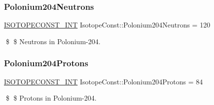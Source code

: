 \subsubsection{\texorpdfstring{Polonium204\+Neutrons}{Polonium204Neutrons}}
{\footnotesize\ttfamily \mbox{\hyperlink{group___isotope_const-_macros_ga5f18360b3e99483a35c32d789e62621c}{I\+S\+O\+T\+O\+P\+E\+C\+O\+N\+S\+T\+\_\+\+I\+NT}} Isotope\+Const\+::\+Polonium204\+Neutrons = 120}

\$ \$ Neutrons in Polonium-\/204. \mbox{\label{group___isotope_const-_polonium-_po204_ga4f330a2e2a2244c34d87a947978771e5}} 
\subsubsection{\texorpdfstring{Polonium204\+Protons}{Polonium204Protons}}
{\footnotesize\ttfamily \mbox{\hyperlink{group___isotope_const-_macros_ga5f18360b3e99483a35c32d789e62621c}{I\+S\+O\+T\+O\+P\+E\+C\+O\+N\+S\+T\+\_\+\+I\+NT}} Isotope\+Const\+::\+Polonium204\+Protons = 84}

\$ \$ Protons in Polonium-\/204. 